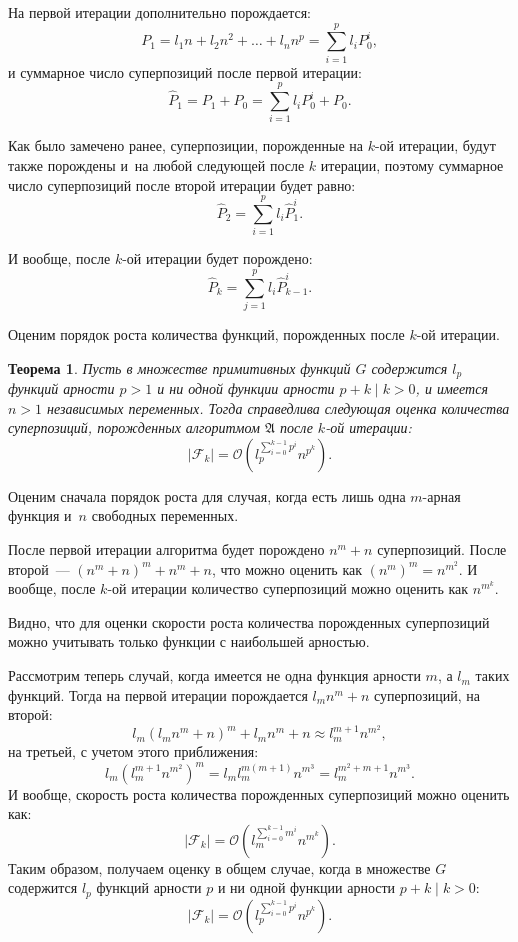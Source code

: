 \documentclass[12pt,a4paper]{article}
\newtheorem{theorem}{Теорема}
\begin{document}
На первой итерации дополнительно порождается:
\[
P_1 = l_1 n + l_2 n^2 + \dots + l_n n^p = \sum_{i=1}^p l_i P_0^i,
\]
и суммарное число суперпозиций после первой итерации:
\[
\hat{P}_1 = P_1 + P_0 = \sum_{i=1}^p l_i P_0^i + P_0.
\]

Как было замечено ранее, суперпозиции, порожденные на $k$-ой итерации, будут
также порождены и~на любой следующей после $k$ итерации, поэтому суммарное
число суперпозиций после второй итерации будет равно:
\[
\hat{P}_2 = \sum_{i=1}^p l_i \hat{P}_1^i.
\]

И вообще, после $k$-ой итерации будет порождено:
\[
\hat{P}_k = \sum_{j=1}^p l_i \hat{P}_{k-1}^i.
\]

Оценим порядок роста количества функций, порожденных после $k$-ой итерации.

\begin{theorem}
  Пусть в множестве примитивных функций $G$ содержится $l_p$ функций арности
  $p > 1$ и ни одной функции арности $p + k \mid k > 0$, и имеется $n > 1$
  независимых переменных. Тогда справедлива следующая оценка количества
  суперпозиций, порожденных алгоритмом $\mathfrak{A}$ после $k$-ой итерации:
  \[
  | \mathcal{F}_k | = \mathcal{O} (l_p^{\sum_{i=0}^{k-1} p^i} n^{p^k}).
  \]
\end{theorem}
\begin{Proof}
  Оценим сначала порядок роста для случая, когда есть лишь одна $m$-арная
  функция и~$n$ свободных переменных.

  После первой итерации алгоритма будет порождено $n^m + n$ суперпозиций.
  После второй~--- $(n^m + n)^m + n^m + n$, что можно оценить как 
  $(n^m)^m = n^{m^2}$. И вообще, после $k$-ой итерации количество
  суперпозиций можно оценить как $n^{m^k}$.

  Видно, что для оценки скорости роста количества порожденных суперпозиций
  можно учитывать только функции с наибольшей арностью.

  Рассмотрим теперь случай, когда имеется не одна функция арности $m$, а
  $l_m$ таких функций. Тогда на первой итерации порождается $l_m n^m + n$
  суперпозиций, на второй:
  \[
  l_m (l_m n^m + n)^m + l_m n^m + n \approx l_m^{m+1} n^{m^2},
  \]
  на третьей, с учетом этого приближения:
  \[
  l_m (l_m^{m+1} n^{m^2})^m = l_m l_m^{m(m+1)} n^{m^3} = l_m^{m^2 + m + 1} n^{m^3}.
  \]
  И вообще, скорость роста количества порожденных суперпозиций можно оценить
  как:
  \[
  | \mathcal{F}_k | = \mathcal{O} (l_m^{\sum_{i=0}^{k-1} m^i} n^{m^k}).
  \]
  Таким образом, получаем оценку в общем случае, когда в множестве $G$ содержится
  $l_p$ функций арности $p$ и ни одной функции арности $p + k \mid k > 0$:
  \[
  | \mathcal{F}_k | = \mathcal{O} (l_p^{\sum_{i=0}^{k-1} p^i} n^{p^k}).
  \]
\end{Proof}
\end{document}
